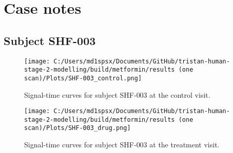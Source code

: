 \documentclass{epflreport}%
\begin{document}
\section{Case notes}%
\label{sec:Casenotes}%

%
\subsection{Subject SHF{-}003}%
\label{subsec:SubjectSHF{-}003}%

%


\begin{figure}[h!]%
\centering%
\texttt{[image: C:/Users/md1spsx/Documents/GitHub/tristan-human-stage-2-modelling/build/metformin/results (one scan)/Plots/SHF-003\_control.png]}%
\caption{Signal{-}time curves for subject SHF{-}003 at the control visit.}%
\end{figure}

%


\begin{figure}[h!]%
\centering%
\texttt{[image: C:/Users/md1spsx/Documents/GitHub/tristan-human-stage-2-modelling/build/metformin/results (one scan)/Plots/SHF-003\_drug.png]}%
\caption{Signal{-}time curves for subject SHF{-}003 at the treatment visit.}%
\end{figure}
\end{document}
